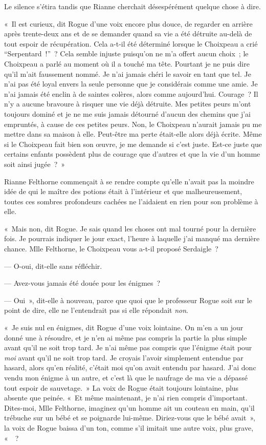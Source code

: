 Le silence s'étira tandis que Rianne cherchait désespérément quelque chose à dire.

«~Il est curieux, dit Rogue d'une voix encore plus douce, de regarder en arrière après trente-deux ans et de se demander quand sa vie a été détruite au-delà de tout espoir de récupération.
Cela a-t-il été déterminé lorsque le Choixpeau a crié “Serpentard~!”~?
Cela semble injuste puisqu'on ne m'a offert aucun choix~; le Choixpeau a parlé au moment où il a touché ma tête.
Pourtant je ne puis dire qu'il m'ait faussement nommé.
Je n'ai jamais chéri le savoir en tant que tel.
Je n'ai pas été loyal envers la seule personne que je considérais comme une amie.
Je n'ai jamais été enclin à de saintes colères, alors comme aujourd'hui.
Courage~?
Il n'y a aucune bravoure à risquer une vie déjà détruite.
Mes petites peurs m'ont toujours dominé et je ne me suis jamais détourné d'aucun des chemins que j'ai empruntés, à cause de ces petites peurs.
Non, le Choixpeau n'aurait jamais pu me mettre dans sa maison à elle.
Peut-être ma perte était-elle alors déjà écrite.
Même si le Choixpeau fait bien son œuvre, je me demande si c'est juste.
Est-ce juste que certains enfants possèdent plus de courage que d'autres et que la vie d'un homme soit ainsi jugée~?~»

Rianne Felthorne commençait à se rendre compte qu'elle n'avait pas la moindre idée de qui le maître des potions était à l'intérieur et que malheureusement, toutes ces sombres profondeurs cachées ne l'aidaient en rien pour son problème à elle.

«~Mais non, dit Rogue.
Je sais quand les choses ont mal tourné pour la dernière fois.
Je pourrais indiquer le jour exact, l'heure à laquelle j'ai manqué ma dernière chance.
Mlle Felthorne, le Choixpeau vous a-t-il proposé Serdaigle~?

--- O-oui, dit-elle sans réfléchir.

--- Avez-vous jamais été douée pour les énigmes~?

--- Oui~», dit-elle à nouveau, parce que quoi que le professeur Rogue soit sur le point de dire, elle ne l'entendrait pas si elle répondait \emph{non}.

«~Je suis nul en énigmes, dit Rogue d'une voix lointaine.
On m'en a un jour donné une à résoudre, et je n'en ai même pas compris la partie la plus simple avant qu'il ne soit trop tard.
Je n'ai même pas compris que l'énigme était pour \emph{moi} avant qu'il ne soit trop tard.
Je croyais l'avoir simplement entendue par hasard, alors qu'en réalité, c'était moi qu'on avait entendu par hasard.
J'ai donc vendu mon énigme à un autre, et c'est là que le naufrage de ma vie a dépassé tout espoir de sauvetage.~»
La voix de Rogue était toujours lointaine, plus absente que peinée.
«~Et même maintenant, je n'ai rien compris d'important.
Dites-moi, Mlle Felthorne, imaginez qu'un homme ait un couteau en main, qu'il trébuche sur un bébé et se poignarde lui-même.
Diriez-vous que le bébé avait~», la voix de Rogue baissa d'un ton, comme s'il imitait une autre voix, plus grave, «~~?

